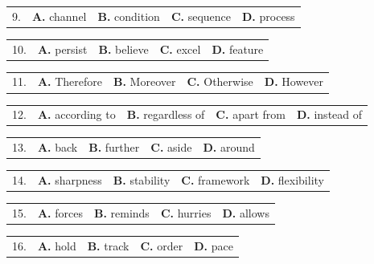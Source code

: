 \documentclass[UTF8,11pt]{ctexart}
\begin{document}
\noindent\begin{tabularx}{\linewidth}{@{}lXXXX@{}}9. & \textbf{A.} channel & \textbf{B.} condition & \textbf{C.} sequence & \textbf{D.} process\\\end{tabularx}\par

\noindent\begin{tabularx}{\linewidth}{@{}lXXXX@{}}10. & \textbf{A.} persist & \textbf{B.} believe & \textbf{C.} excel & \textbf{D.} feature\\\end{tabularx}\par

\noindent\begin{tabularx}{\linewidth}{@{}lXXXX@{}}11. & \textbf{A.} Therefore & \textbf{B.} Moreover & \textbf{C.} Otherwise & \textbf{D.} However\\\end{tabularx}\par

\noindent\begin{tabularx}{\linewidth}{@{}lXXXX@{}}12. & \textbf{A.} according to & \textbf{B.} regardless of & \textbf{C.} apart from & \textbf{D.} instead of\\\end{tabularx}\par

\noindent\begin{tabularx}{\linewidth}{@{}lXXXX@{}}13. & \textbf{A.} back & \textbf{B.} further & \textbf{C.} aside & \textbf{D.} around\\\end{tabularx}\par

\noindent\begin{tabularx}{\linewidth}{@{}lXXXX@{}}14. & \textbf{A.} sharpness & \textbf{B.} stability & \textbf{C.} framework & \textbf{D.} flexibility\\\end{tabularx}\par

\noindent\begin{tabularx}{\linewidth}{@{}lXXXX@{}}15. & \textbf{A.} forces & \textbf{B.} reminds & \textbf{C.} hurries & \textbf{D.} allows\\\end{tabularx}\par

\noindent\begin{tabularx}{\linewidth}{@{}lXXXX@{}}16. & \textbf{A.} hold & \textbf{B.} track & \textbf{C.} order & \textbf{D.} pace\\\end{tabularx}\par
\end{document}
